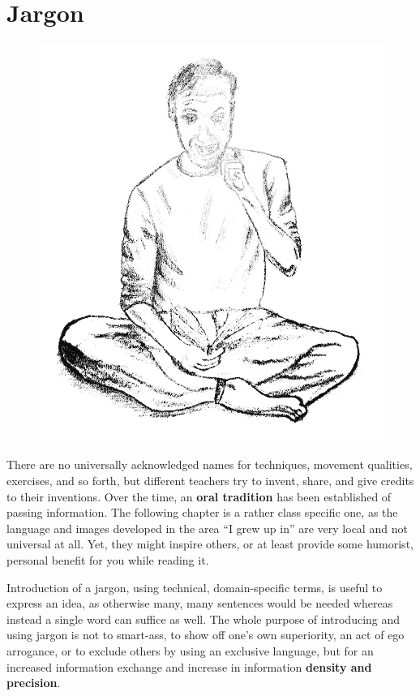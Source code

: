\chapter{Jargon}\label{ch:jargon}

\begin{figure}[h]
    \begin{center}
    {\includegraphics[width=0.3\paperwidth]{images/testpic}}
    \end{center}\label{img:jargon}
\end{figure}

There are no universally acknowledged names for techniques, movement qualities, exercises, and so forth, but different teachers try to invent, share, and give credits to their inventions.
Over the time, an \textbf{oral tradition} has been established of passing information.
The following chapter is a rather class specific one, as the language and images developed in the area ``I grew up in'' are very local and not universal at all.
Yet, they might inspire others, or at least provide some humorist, personal benefit for you while reading it.

Introduction of a jargon, using technical, domain-specific terms, is useful to express an idea, as otherwise many, many sentences would be needed whereas instead a single word can suffice as well.
The whole purpose of introducing and using jargon is not to smart-ass, to show off one's own superiority, an act of ego arrogance, or to exclude others by using an exclusive language, but for an increased information exchange and increase in information \textbf{density and precision}.

